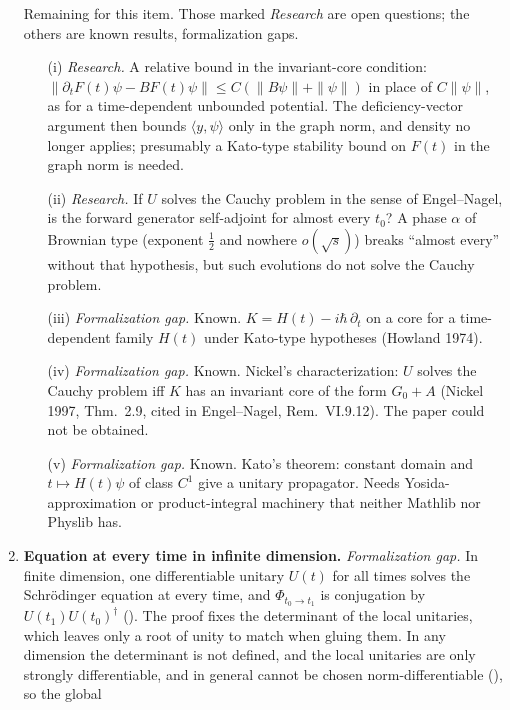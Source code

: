 \documentclass[11pt]{article}
\begin{document}
\begin{enumerate}
  Remaining for this item. Those marked \emph{Research} are open questions; the others are known
  results, formalization gaps.
  \begin{enumerate}
  \item[(i)] \emph{Research.} A relative bound in the invariant-core condition:
    $\|\partial_t F(t)\psi - BF(t)\psi\| \le C(\|B\psi\| + \|\psi\|)$ in place of
    $C\|\psi\|$, as for a time-dependent unbounded potential. The deficiency-vector argument
    then bounds $\langle y,\psi\rangle$ only in the graph norm, and density no longer
    applies; presumably a Kato-type stability bound on $F(t)$ in the graph norm is needed.
  \item[(ii)] \emph{Research.} If $U$ solves the Cauchy problem in the sense of Engel--Nagel,
    is the forward generator self-adjoint for almost every $t_0$? A phase $\alpha$ of
    Brownian type (exponent $\tfrac12$ and nowhere $o(\sqrt s)$) breaks ``almost every''
    without that hypothesis, but such evolutions do not solve the Cauchy problem.
  \item[(iii)] \emph{Formalization gap.} Known. $K = H(t) - i\hbar\,\partial_t$ on a core for a time-dependent family
    $H(t)$ under Kato-type hypotheses (Howland 1974).
  \item[(iv)] \emph{Formalization gap.} Known. Nickel's characterization: $U$ solves the Cauchy problem iff $K$ has an
    invariant core of the form $G_0 + A$ (Nickel 1997, Thm.~2.9, cited in Engel--Nagel,
    Rem.~VI.9.12). The paper could not be obtained.
  \item[(v)] \emph{Formalization gap.} Known. Kato's theorem: constant domain and $t \mapsto H(t)\psi$ of class $C^1$
    give a unitary propagator. Needs Yosida-approximation or product-integral machinery that
    neither Mathlib nor Physlib has.
  \end{enumerate}
\item \textbf{Equation at every time in infinite dimension.} \emph{Formalization gap.} In finite dimension, one
  differentiable unitary $U(t)$ for all times solves the Schr\"odinger equation at every time,
  and $\Phi_{t_0\to t_1}$ is conjugation by $U(t_1)U(t_0)^\dagger$
  (). The proof fixes the determinant of the local
  unitaries, which leaves only a root of unity to match when gluing them. In any dimension the
  determinant is not defined, and the local unitaries are only strongly differentiable, and in
  general cannot be chosen norm-differentiable (), so the global

\end{enumerate}
\end{document}
